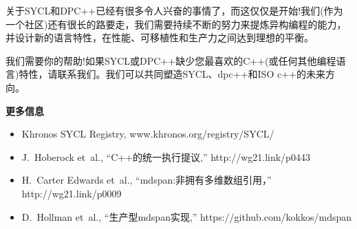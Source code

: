 
关于SYCL和DPC++已经有很多令人兴奋的事情了，而这仅仅是开始!我们(作为一个社区)还有很长的路要走，我们需要持续不断的努力来提炼异构编程的能力，并设计新的语言特性，在性能、可移植性和生产力之间达到理想的平衡。\par

我们需要你的帮助!如果SYCL或DPC++缺少您最喜欢的C++(或任何其他编程语言)特性，请联系我们。我们可以共同塑造SYCL、dpc++和ISO c++的未来方向。\par

\hspace*{\fill} \par %
\textbf{更多信息}

\begin{itemize}
	\item Khronos SYCL Registry, www.khronos.org/registry/SYCL/
	\item J. Hoberock et al., “C++的统一执行提议,” http://wg21.link/p0443
	\item H. Carter Edwards et al., “mdspan:非拥有多维数组引用，” http://wg21.link/p0009
	\item D. Hollman et al., “生产型mdspan实现,” https://github.com/kokkos/mdspan
\end{itemize}

\newpage